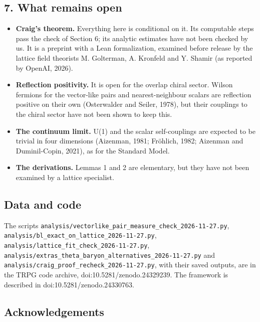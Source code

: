\documentclass[
]{article}
\providecommand{\tightlist}{%
  \setlength{\itemsep}{0pt}\setlength{\parskip}{0pt}}
\begin{document}
\hypertarget{what-remains-open}{%
\subsection{7. What remains open}\label{what-remains-open}}

\begin{itemize}
\tightlist
\item
  \textbf{Craig's theorem.} Everything here is conditional on it. Its
  computable steps pass the check of Section 6; its analytic estimates
  have not been checked by us. It is a preprint with a Lean
  formalization, examined before release by the lattice field theorists
  M. Golterman, A. Kronfeld and Y. Shamir (as reported by OpenAI, 2026).
\item
  \textbf{Reflection positivity.} It is open for the overlap chiral
  sector. Wilson fermions for the vector-like pairs and
  nearest-neighbour scalars are reflection positive on their own
  (Osterwalder and Seiler, 1978), but their couplings to the chiral
  sector have not been shown to keep this.
\item
  \textbf{The continuum limit.} U(1) and the scalar self-couplings are
  expected to be trivial in four dimensions (Aizenman, 1981; Fröhlich,
  1982; Aizenman and Duminil-Copin, 2021), as for the Standard Model.
\item
  \textbf{The derivations.} Lemmas 1 and 2 are elementary, but they have
  not been examined by a lattice specialist.
\end{itemize}

\hypertarget{data-and-code}{%
\subsection{Data and code}\label{data-and-code}}
\begingroup\raggedright

The scripts
\nolinkurl{analysis/vectorlike_pair_measure_check_2026-11-27.py},
\nolinkurl{analysis/bl_exact_on_lattice_2026-11-27.py},
\nolinkurl{analysis/lattice_fit_check_2026-11-27.py},
\nolinkurl{analysis/extras_theta_baryon_alternatives_2026-11-27.py} and
\nolinkurl{analysis/craig_proof_recheck_2026-11-27.py}, with their saved
outputs, are in the TRPG code archive, doi:10.5281/zenodo.24329239. The
framework is described in doi:10.5281/zenodo.24330763.
\par\endgroup

\hypertarget{acknowledgements}{%
\subsection{Acknowledgements}\label{acknowledgements}}
\end{document}
